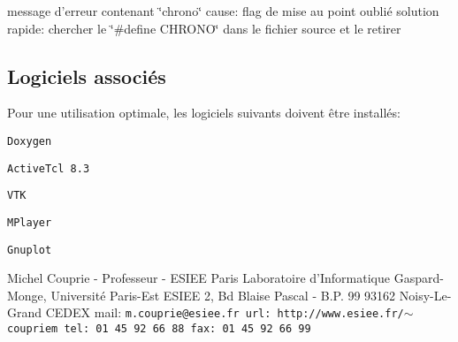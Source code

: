 message d'erreur contenant \char`\"{}chrono\char`\"{} cause: flag de mise au point oubli\'{e} solution rapide: chercher le \char`\"{}\#define CHRONO\char`\"{} dans le fichier source et le retirer\subsection{Logiciels associ\'{e}s}\label{index_associes}
Pour une utilisation optimale, les logiciels suivants doivent \^{e}tre install\'{e}s:\par
\par
 {\tt Doxygen}\par
 {\tt Active\-Tcl 8.3}\par
 {\tt VTK}\par
 {\tt MPlayer}\par
 {\tt Gnuplot}\par




 Michel Couprie - Professeur - ESIEE Paris Laboratoire d'Informatique Gaspard-Monge, Universit\'{e} Paris-Est ESIEE 2, Bd Blaise Pascal - B.P. 99 93162 Noisy-Le-Grand CEDEX mail: \tt{m.couprie@esiee.fr} url: \tt{http://www.esiee.fr/$\sim$coupriem} tel: 01 45 92 66 88 fax: 01 45 92 66 99 
